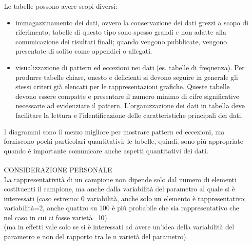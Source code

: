 \documentclass[10pt, draft]{book}
\begin{document}
Le tabelle possono avere scopi diversi:
\begin{itemize}
    \item immagazzinamento dei dati, ovvero la conservazione dei dati grezzi a scopo di riferimento; tabelle di questo tipo sono spesso grandi e non adatte alla comunicazione dei risultati finali; quando vengono pubblicate, vengono presentate di solito come appendici o allegati.
    \item visualizzazione di pattern ed eccezioni nei dati (es. tabelle di frequenza). Per produrre tabelle chiare, onesto e deficienti si devono seguire in generale gli stessi criteri già elencati per le rappresentazioni grafiche. Queste tabelle devono essere compatte e presentare il numero minimo di cifre significative necessarie ad evidenziare il pattern. L'organizzazione dei dati in tabella deve facilitare la lettura e l'identificazione delle caratteristiche principali dei dati.
\end{itemize}
I diagrammi sono il mezzo migliore per mostrare pattern ed eccezioni, ma forniscono pochi particolari quantitativi; le tabelle, quindi, sono più appropriate quando è importante comunicare anche aspetti quantitativi dei dati.
\\
\\
CONSIDERAZIONE PERSONALE
\\
La rappresentatività di un campione non dipende solo dal numero di elementi costituenti il campione, ma anche dalla variabilità del parametro al quale si è interessati (caso estremo: 0 variabilità, anche solo un elemento è rappresentativo; variabilità=2, anche quattro su 100 è più probabile che sia rappresentativo che nel caso in cui ci fosse varietà=10).
\\
(ma in effetti vale solo se si è interessati ad avere un’idea della variabilità del parametro e non del rapporto tra le n varietà del parametro).
\end{document}
